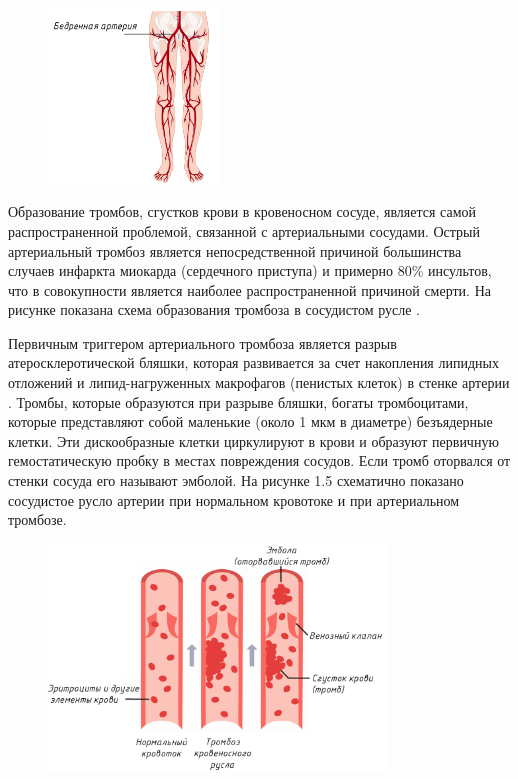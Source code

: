 \begin{figure}[!h]
\begin{center}
\includegraphics[width=0.4\textwidth]{Рисунки/бедренная артерия.png}
\caption{\centering {}}
\label{част}
\end{center}
\end{figure}

Образование тромбов, сгустков крови в кровеносном сосуде, является самой распространенной проблемой, связанной с артериальными сосудами. Острый артериальный тромбоз является непосредственной причиной большинства случаев инфаркта миокарда (сердечного приступа) и примерно 80\% инсультов, что в совокупности является наиболее распространенной причиной смерти. На рисунке показана схема образования тромбоза в сосудистом русле \cite{litlink9}.

Первичным триггером артериального тромбоза является разрыв атеросклеротической бляшки, которая развивается за счет накопления липидных отложений и липид-нагруженных макрофагов (пенистых клеток) в стенке артерии \cite{litlink9}. Тромбы, которые образуются при разрыве бляшки, богаты тромбоцитами, которые представляют собой маленькие (около 1 мкм в диаметре) безъядерные клетки. Эти дискообразные клетки циркулируют в крови и образуют первичную гемостатическую пробку в местах повреждения сосудов. Если тромб оторвался от стенки сосуда его называют эмболой. На рисунке 1.5 схематично показано сосудистое русло артерии при нормальном кровотоке и при артериальном тромбозе.

\begin{figure}[!h]
\begin{center}
\includegraphics[width=0.8\textwidth]{Рисунки/тромбоз.png}
\caption{\centering {}}
\label{част}
\end{center}
\end{figure}

